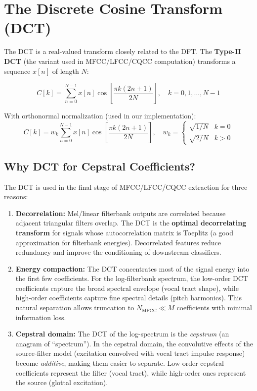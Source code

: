\documentclass[12pt]{report}
\begin{document}
\section{The Discrete Cosine Transform (DCT)}

The DCT is a real-valued transform closely related to the DFT. The \textbf{Type-II DCT}
(the variant used in MFCC/LFCC/CQCC computation) transforms a sequence $x[n]$ of length $N$:

\begin{equation}
    C[k] = \sum_{n=0}^{N-1} x[n] \cos\!\left[\frac{\pi k (2n + 1)}{2N}\right], \quad k = 0, 1, \ldots, N-1
    \label{eq:dct2}
\end{equation}

With orthonormal normalization (used in our implementation):
\begin{equation}
    C[k] = w_k \sum_{n=0}^{N-1} x[n] \cos\!\left[\frac{\pi k (2n + 1)}{2N}\right],
    \quad w_k = \begin{cases} \sqrt{1/N} & k = 0 \\ \sqrt{2/N} & k > 0 \end{cases}
\end{equation}

\subsection{Why DCT for Cepstral Coefficients?}

The DCT is used in the final stage of MFCC/LFCC/CQCC extraction for three reasons:

\begin{enumerate}
    \item \textbf{Decorrelation:} Mel/linear filterbank outputs are correlated because adjacent
          triangular filters overlap. The DCT is the \textbf{optimal decorrelating transform}
          for signals whose autocorrelation matrix is Toeplitz (a good approximation for
          filterbank energies). Decorrelated features reduce redundancy and improve the
          conditioning of downstream classifiers.

    \item \textbf{Energy compaction:} The DCT concentrates most of the signal energy into the
          first few coefficients. For the log-filterbank spectrum, the low-order DCT
          coefficients capture the broad spectral envelope (vocal tract shape), while
          high-order coefficients capture fine spectral details (pitch harmonics). This
          natural separation allows truncation to $N_\text{MFCC} \ll M$ coefficients with
          minimal information loss.

    \item \textbf{Cepstral domain:} The DCT of the log-spectrum is the \emph{cepstrum}
          (an anagram of ``spectrum''). In the cepstral domain, the convolutive effects
          of the source-filter model (excitation convolved with vocal tract impulse response)
          become \emph{additive}, making them easier to separate. Low-order cepstral
          coefficients represent the filter (vocal tract), while high-order ones represent
          the source (glottal excitation).
\end{enumerate}
\end{document}
